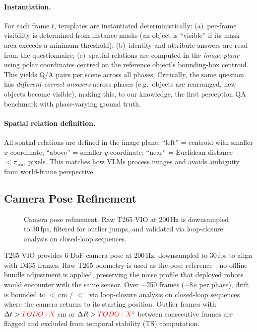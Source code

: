 \paragraph{Instantiation.}
For each frame $t$, templates are instantiated deterministically:
(a)~per-frame visibility is determined from instance masks (an object is ``visible'' if its mask area exceeds a minimum threshold);
(b)~identity and attribute answers are read from the questionnaire;
(c)~spatial relations are computed in the \textit{image plane} using polar coordinates centred on the reference object's bounding-box centroid.
This yields  Q/A pairs per scene across all phases.
Critically, the same question has \textit{different correct answers} across phases (e.g.\ objects are rearranged, new objects become visible), making this, to our knowledge, the first perception QA benchmark with phase-varying ground truth.

\paragraph{Spatial relation definition.}
All spatial relations are defined in the image plane: ``left'' = centroid with smaller $x$-coordinate; ``above'' = smaller $y$-coordinate; ``near'' = Euclidean distance $<\tau_\text{near}$ pixels.
This matches how VLMs process images and avoids ambiguity from world-frame perspective.

\subsection{Camera Pose Refinement}
\label{sec:appendix-pose}

\begin{figure}[h]
    \centering
    \caption{Camera pose refinement. Raw T265 VIO at 200\,Hz is downsampled to 30\,fps,
    filtered for outlier jumps, and validated via loop-closure analysis on closed-loop sequences.}
    \label{fig:pose-refinement}
\end{figure}

T265 VIO provides 6-DoF camera pose at 200\,Hz, downsampled to 30\,fps to align with D435 frames.
Raw T265 odometry is used as the pose reference---no offline bundle adjustment is applied, preserving the noise profile that deployed robots would encounter with the same sensor.
Over ${\sim}$250 frames (${\sim}$8\,s per phase), drift is bounded to $<$\,cm / $<$$^\circ$ via loop-closure analysis on  closed-loop sequences where the camera returns to its starting position.
Outlier frames with $\Delta t > \textcolor{red}{TODO: X}$\,cm or $\Delta R > \textcolor{red}{TODO: X}^\circ$ between consecutive frames are flagged and excluded from temporal stability (TS) computation.

